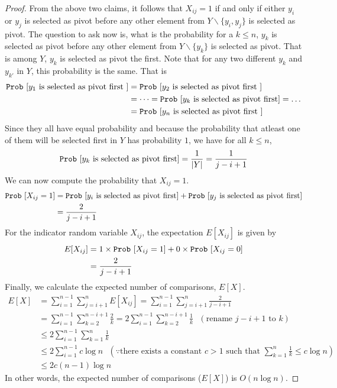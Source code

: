 \begin{proof}
\noindent From the above two claims, it follows that $X_{ij}=1$ if and only if either $y_i$ or $y_j$ is selected as pivot before any other element from $Y \backslash \{y_i,y_j\}$ is selected as pivot. The question to ask now is, what is the probability for a $k \leq n$, $y_k$ is selected as pivot before any other element from $Y \backslash \{y_k\}$ is selected as pivot. That is among $Y$, $y_k$ is selected as pivot the first. Note that for any two different $y_k$ and $y_{k'}$ in $Y$, this probability is the same. That is
\begin{align*}
\mathtt{Prob}~[y_1 \text{ is selected as pivot first }] & = \mathtt{Prob}~[y_2 \text{ is selected as pivot first }] \\
& = \dots = \mathtt{Prob}~[y_k \text{ is selected as pivot first}] = \dots \\
& = \mathtt{Prob}~[y_n \text{ is selected as pivot first }] 
\end{align*}
Since they all have equal probability and because the probability that atleast one of them will be selected first in $Y$ has probability $1$, we have for all $k \leq n$,
\[
\mathtt{Prob}~[y_k \text{ is selected as pivot first}] = \frac{1}{|Y|}=\frac{1}{j-i+1}
\]
We can now compute the probability that $X_{ij}=1$. 
\begin{align*}
\mathtt{Prob}~[X_{ij} = 1] & = \mathtt{Prob}~[y_i \text{ is selected as pivot first}]  + \mathtt{Prob}~[y_j \text{ is selected as pivot first}]  \\
& = \frac{2}{j-i+1}
\end{align*}
For the indicator random variable $X_{ij}$, the expectation $E[X_{ij}]$ is given by
\begin{align*}
E[X_{ij}] & = 1 \times \mathtt{Prob}~[X_{ij}=1] + 0 \times \mathtt{Prob}~[X_{ij}=0] \\
& = \frac{2}{j-i+1} 
\end{align*}
Finally, we calculate the expected number of comparisons, $E[X]$. 
\begin{align*}
E[X] & = \sum_{i=1}^{n-1} \sum_{j=i+1}^n E[X_{ij}]  = \sum_{i=1}^{n-1} \sum_{j=i+1}^n \frac{2}{j-i+1} \\
& = \sum_{i=1}^{n-1} \sum_{k=2}^{n-i+1} \frac{2}{k} = 2 \sum_{i=1}^{n-1} \sum_{k=2}^{n-i+1} \frac{1}{k} ~~~(\text{rename $j-i+1$ to $k$}) \\
& \leq 2 \sum_{i=1}^{n-1} \sum_{k=1}^n \frac{1}{k} \\
& \leq 2 \sum_{i=1}^{n-1} c \log n ~~~(\because \text{there exists a constant $c > 1$ such that $\sum_{k=1}^n \frac{1}{k} \leq c \log n$}) \\
& \leq 2c (n-1) \log n
\end{align*}
In other words, the expected number of comparisons ($E[X]$) is  $O(n \log n)$. 
\end{proof}

